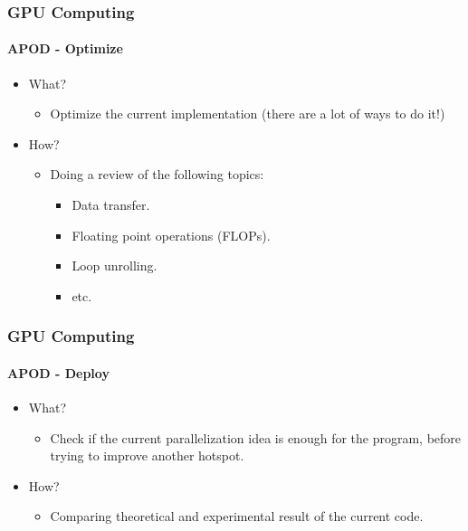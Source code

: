 \begin{frame}
    \frametitle{GPU Computing}
    \framesubtitle{APOD - Optimize}
    \begin{itemize}
        \item What?
        \begin{itemize}
            \item Optimize the current implementation (there are a lot of ways to do it!)
        \end{itemize}
        \item How?
        \begin{itemize}
            \item Doing a review of the following topics:
            \begin{itemize}
                \item Data transfer.
                \item Floating point operations (FLOPs).
                \item Loop unrolling.
                \item etc.
            \end{itemize}
        \end{itemize}
    \end{itemize}
\end{frame}

\begin{frame}
    \frametitle{GPU Computing}
    \framesubtitle{APOD - Deploy}
    \begin{itemize}
        \item What?
        \begin{itemize}
            \item Check if the current parallelization idea is enough for the program,
              before trying to improve another hotspot.
        \end{itemize}
        \item How?
        \begin{itemize}
            \item Comparing theoretical and experimental result of the current code.
        \end{itemize}
    \end{itemize}
\end{frame}
